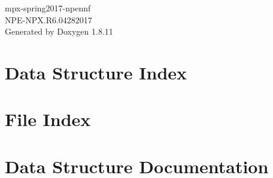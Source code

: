 \documentclass[twoside]{book}
\newcommand{\+}{\discretionary{\mbox{\scriptsize$\hookleftarrow$}}{}{}}
\newcommand{\clearemptydoublepage}{%
  \newpage{\pagestyle{empty}\cleardoublepage}%
}
\begin{document}
\hypersetup{pageanchor=false,
             bookmarksnumbered=true,
             pdfencoding=unicode
            }
\begin{titlepage}
\vspace*{7cm}
\begin{center}%
{\Large mpx-\/spring2017-\/npennf \\[1ex]\large N\+P\+E-\/\+N\+P\+X.\+R6.\+04282017 }\\
\vspace*{1cm}
{\large Generated by Doxygen 1.8.11}\\
\end{center}
\end{titlepage}
\clearemptydoublepage
\tableofcontents
\clearemptydoublepage
{}
\hypersetup{pageanchor=true}

\chapter{Data Structure Index}

\chapter{File Index}

\chapter{Data Structure Documentation}























\end{document}
